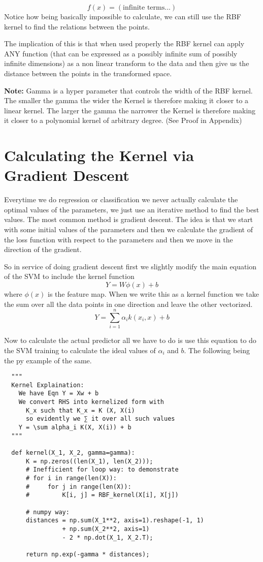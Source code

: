 \documentclass[hidelinks]{book}
\numberwithin{equation}{section}
\begin{document}
  $$ f(x) = (\text{infinite terms...}) $$ Notice how being basically
  impossible to calculate, we can still use the RBF kernel to find the
  relations between the points.

  The implication of this is that when used properly the RBF kernel can
  apply ANY function (that can be expressed as a possibly infinite sum of possibly infinite dimensions)
  as a non linear transform to the data and then give us the distance between
  the points in the transformed space.

  \textbf{Note:} Gamma is a hyper parameter that controls the width of the RBF kernel.
  The smaller the gamma the wider the Kernel is therefore making it closer to a
  linear kernel. The larger the gamma the narrower the Kernel is therefore making
  it closer to a polynomial kernel of arbitrary degree. (See Proof in Appendix)

\section{Calculating the Kernel via Gradient Descent}
  Everytime we do regression or classification we never actually calculate the
  optimal values of the parameters, we just use an iterative method to find
  the best values. The most common method is gradient descent. The idea is
  that we start with some initial values of the parameters and then we
  calculate the gradient of the loss function with respect to the parameters
  and then we move in the direction of the gradient.

  So in service of doing gradient descent first we slightly modify the
  main equation of the SVM to include the kernel function
  $$ Y = W\phi(x) +b $$ where $\phi(x)$ is the feature map. When we write this
  as a kernel function we take the sum over all the data points in one direction
  and leave the other vectorized.
  $$ Y = \sum_{i=1}^n \alpha_i k(x_i, x) + b $$

  Now to calculate the actual predictor all we have to do is use this equation
  to do the SVM training to calculate the ideal values of $\alpha_i$ and $b$.
  The following being the py example of the same.
  \begin{verbatim}
  """
  Kernel Explaination:
    We have Eqn Y = Xw + b
    We convert RHS into kernelized form with
      K_x such that K_x = K (X, X(i)
      so evidently we ∑ it over all such values
    Y = \sum alpha_i K(X, X(i)) + b
  """

  def kernel(X_1, X_2, gamma=gamma):
      K = np.zeros((len(X_1), len(X_2)));
      # Inefficient for loop way: to demonstrate
      # for i in range(len(X)):
      #     for j in range(len(X)):
      #         K[i, j] = RBF_kernel(X[i], X[j])

      # numpy way:
      distances = np.sum(X_1**2, axis=1).reshape(-1, 1)
                + np.sum(X_2**2, axis=1)
                - 2 * np.dot(X_1, X_2.T);

      return np.exp(-gamma * distances);
  \end{verbatim}
\end{document}
